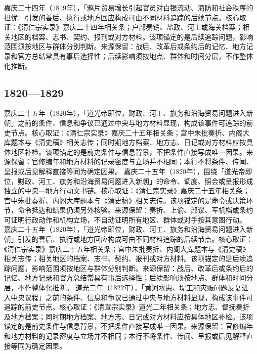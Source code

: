 嘉庆二十四年（1819年），「鸦片贸易增长引起官员对白银流动、海防和社会秩序的担忧」引发的善后、执行或地方回应构成可由不同材料追踪的后续节点。核心取证：《清仁宗实录》嘉庆二十四年相关条；户部奏销、盐政、河工或海关档案；相关地区的档案、志书、契约、报刊或对方材料。该项锚定的是后续追踪问题，影响范围须按地区与群体分别判断。来源保留：战后、改革后或条约后的记忆、地方记录和官方总结常具有事后选择性；后续影响须按地点、群体和时间分层，不作整体化推断。
\subsection{1820—1829}
嘉庆二十五年（1820年），「道光帝即位，财政、河工、旗务和沿海贸易问题进入新朝」之前的条件、信息和争议已通过中央与地方材料显现，构成该事件可追踪的前史节点。核心取证：《清仁宗实录》嘉庆二十五年相关条；宫中朱批奏折、内阁大库题本与《清史稿》相关志传；同时期地方档案、地方志、日记或对方材料应按具体地区补检。该项锚定的是前史条件与信息背景，不把条件直接写成唯一因果。来源保留：官修编年和地方材料的记录密度与立场并不相同；本行不将条件、传闻、呈报或后见解释直接等同为确定因果。
嘉庆二十五年（1820年），围绕「道光帝即位，财政、河工、旗务和沿海贸易问题进入新朝」的命令、调度、照会或呈报形成独立的中央—地方行动文书链。核心取证：《清仁宗实录》嘉庆二十五年相关条；宫中朱批奏折、内阁大库题本与《清史稿》相关志传。该项锚定的是命令或决策环节，命令抵达和结果仍须另外核验。来源保留：奏折、上谕、部议、军机档或条约可证明行政动作和机构立场，不自动证明所有地区、群体或对手按其意图行动。
嘉庆二十五年（1820年），「道光帝即位，财政、河工、旗务和沿海贸易问题进入新朝」引发的善后、执行或地方回应构成可由不同材料追踪的后续节点。核心取证：《清仁宗实录》嘉庆二十五年相关条；宫中朱批奏折、内阁大库题本与《清史稿》相关志传；相关地区的档案、志书、契约、报刊或对方材料。该项锚定的是后续追踪问题，影响范围须按地区与群体分别判断。来源保留：战后、改革后或条约后的记忆、地方记录和官方总结常具有事后选择性；后续影响须按地点、群体和时间分层，不作整体化推断。
道光二年（1822年），「黄河水患、堤工和灾赈问题反复进入中央议程」之前的条件、信息和争议已通过中央与地方材料显现，构成该事件可追踪的前史节点。核心取证：《清宣宗实录》道光二年相关条；地方志、督抚奏折及地方档案；同时期地方档案、地方志、日记或对方材料应按具体地区补检。该项锚定的是前史条件与信息背景，不把条件直接写成唯一因果。来源保留：官修编年和地方材料的记录密度与立场并不相同；本行不将条件、传闻、呈报或后见解释直接等同为确定因果。
